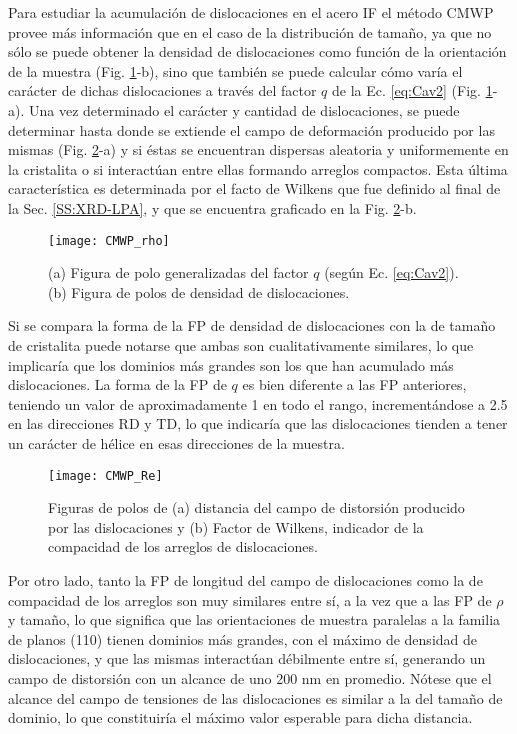 Para estudiar la acumulación de dislocaciones en el acero IF el método CMWP provee más información que en el caso de la distribución de tamaño, ya que no sólo se puede obtener la densidad de dislocaciones como función de la orientación de la muestra (Fig. \ref{fig:IFCMWPrho}-b), sino que también se puede calcular cómo varía el carácter de dichas dislocaciones a través del factor $q$ de la Ec. \ref{eq:Cav2} (Fig. \ref{fig:IFCMWPrho}-a).
Una vez determinado el carácter y cantidad de dislocaciones, se puede determinar hasta donde se extiende el campo de deformación producido por las mismas (Fig. \ref{fig:IFCMWPRe}-a) y si éstas se encuentran dispersas aleatoria y uniformemente en la cristalita o si interactúan entre ellas formando arreglos compactos.
Esta última característica es determinada por el facto de Wilkens que fue definido al final de la Sec. \ref{SS:XRD-LPA}, y que se encuentra graficado en la Fig. \ref{fig:IFCMWPRe}-b.

\begin{figure}[!htb]
  \centering
  \texttt{[image: CMWP\_rho]}
  \caption{(a) Figura de polo generalizadas del factor $q$ (según Ec. \ref{eq:Cav2}). (b) Figura de polos de densidad de dislocaciones.}
  \label{fig:IFCMWPrho}
\end{figure}

Si se compara la forma de la FP de densidad de dislocaciones con la de tamaño de cristalita puede notarse que ambas son cualitativamente similares, lo que implicaría que los dominios más grandes son los que han acumulado más dislocaciones.
La forma de la FP de $q$ es bien diferente a las FP anteriores, teniendo un valor de aproximadamente 1 en todo el rango, incrementándose a 2.5 en las direcciones RD y TD, lo que indicaría que las dislocaciones tienden a tener un carácter de hélice en esas direcciones de la muestra.

\begin{figure}[!htb]
  \centering
  \texttt{[image: CMWP\_Re]}
  \caption{Figuras de polos de (a) distancia del campo de distorsión producido por las dislocaciones y (b) Factor de Wilkens, indicador de la compacidad de los arreglos de dislocaciones.}
  \label{fig:IFCMWPRe}
\end{figure}

Por otro lado, tanto la FP de longitud del campo de dislocaciones como la de compacidad de los arreglos son muy similares entre sí, a la vez que a las FP de $\rho$ y tamaño, lo que significa que las orientaciones de muestra paralelas a la familia de planos (110) tienen dominios más grandes, con el máximo de densidad de dislocaciones, y que las mismas interactúan débilmente entre sí, generando un campo de distorsión con un alcance de uno 200 nm en promedio. Nótese que el alcance del campo de tensiones de las dislocaciones es similar a la del tamaño de dominio, lo que constituiría el máximo valor esperable para dicha distancia.

